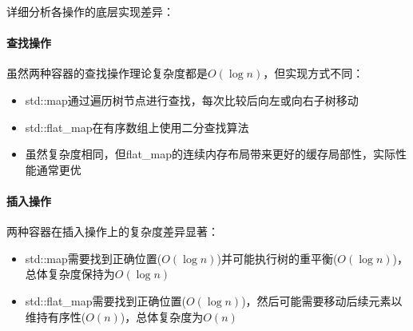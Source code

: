 \documentclass[a4paper, 12pt]{article}
\begin{document}
\begin{center}\vspace{-20pt}
    \end{center}

详细分析各操作的底层实现差异：

\paragraph{查找操作} 虽然两种容器的查找操作理论复杂度都是$O(\log n)$，但实现方式不同：
\begin{itemize}
    \setlength{\itemsep}{0pt}
    \setlength{\parsep}{0pt}
    \setlength{\parskip}{0pt}
    \item std::map通过遍历树节点进行查找，每次比较后向左或向右子树移动
    \item std::flat\_map在有序数组上使用二分查找算法
    \item 虽然复杂度相同，但flat\_map的连续内存布局带来更好的缓存局部性，实际性能通常更优
\end{itemize}

\paragraph{插入操作} 两种容器在插入操作上的复杂度差异显著：
\begin{itemize}
    \setlength{\itemsep}{0pt}
    \setlength{\parsep}{0pt}
    \setlength{\parskip}{0pt}
    \item std::map需要找到正确位置($O(\log n)$)并可能执行树的重平衡($O(\log n)$)，总体复杂度保持为$O(\log n)$
    \item std::flat\_map需要找到正确位置($O(\log n)$)，然后可能需要移动后续元素以维持有序性($O(n)$)，总体复杂度为$O(n)$
\end{itemize}
\end{document}
